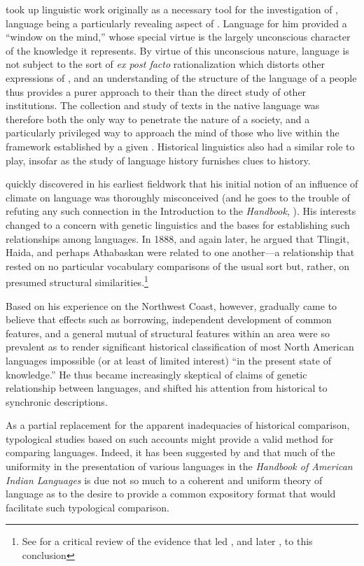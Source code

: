 {\Boas} took up linguistic work originally as a necessary tool for the
investigation of , language being a particularly revealing
aspect of . Language for him provided a ``window on the mind,''
whose special virtue is the largely unconscious character of the
knowledge it represents. By virtue of this unconscious nature,
language is not subject to the sort of \emph{ex post facto}
rationalization which distorts other expressions of , and an
understanding of the structure of the language of a people thus
provides a purer approach to their  than the direct study of
other institutions. The collection and study of texts in the native
language was therefore both the only way to penetrate the nature of a
society, and a particularly privileged way to approach the mind of
those who live within the framework established by a given
. Historical linguistics also had a similar role to play,
insofar as the study of language history furnishes clues to 
history.

{\Boas} quickly discovered in his earliest fieldwork that his initial
notion of an influence of climate on language was thoroughly
misconceived (and he goes to the trouble of refuting any such
connection in the Introduction to the \textsl{Handbook},
\citealt{boas11:introduction}). His interests changed to a concern
with genetic linguistics and the bases for establishing such
relationships among languages. In 1888, and again later, he argued
that Tlingit, Haida, and perhaps Athabaskan were related to one
another—a relationship that rested on no particular vocabulary
comparisons of the usual sort but, rather, on presumed structural
similarities.\footnote{See \citealt{levine79:nadene} for a critical review of
the evidence that led {\Boas}, and later {\Sapir}, to this conclusion}

Based on his experience on the Northwest Coast, however, {\Boas}
gradually came to believe that effects such as borrowing, independent
development of common features, and a general mutual  of
structural features within an area were so prevalent as to render
significant historical classification of most North American languages
impossible (or at least of limited interest) ``in the present state of
knowledge.'' He thus became increasingly skeptical of claims of genetic
relationship between languages, and shifted his attention from
historical to synchronic descriptions.

As a partial replacement for the apparent inadequacies of historical
comparison, typological studies based on such accounts might provide a
valid method for comparing languages. Indeed, it has been suggested by
\citet{voegelin52:boas} and \citet{stocking74:boas} that much of the
uniformity in the presentation of various languages in the
\textsl{Handbook of American Indian Languages} is due not so much to a
coherent and uniform theory of language as to the desire to provide a
common expository format that would facilitate such typological
comparison.

